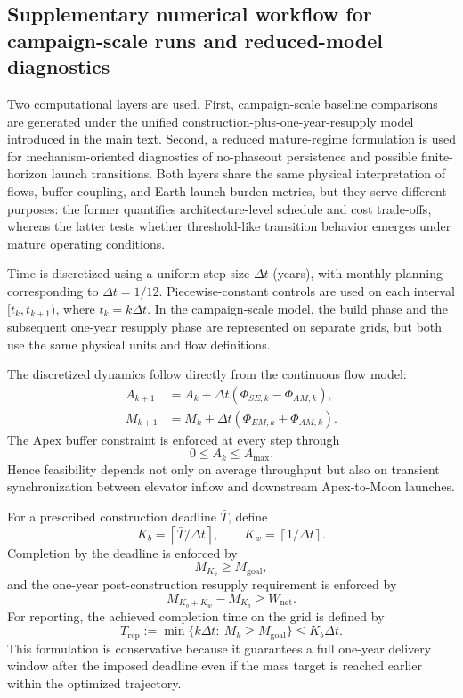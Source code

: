 \documentclass[12pt]{article}
\begin{document}
\subsection{Supplementary numerical workflow for campaign-scale runs and reduced-model diagnostics}
\label{app:numerics}

Two computational layers are used. First, campaign-scale baseline comparisons are generated under the unified construction-plus-one-year-resupply model introduced in the main text. Second, a reduced mature-regime formulation is used for mechanism-oriented diagnostics of no-phaseout persistence and possible finite-horizon launch transitions. Both layers share the same physical interpretation of flows, buffer coupling, and Earth-launch-burden metrics, but they serve different purposes: the former quantifies architecture-level schedule and cost trade-offs, whereas the latter tests whether threshold-like transition behavior emerges under mature operating conditions.

Time is discretized using a uniform step size $\Delta t$ (years), with monthly planning corresponding to $\Delta t=1/12$. Piecewise-constant controls are used on each interval $[t_k,t_{k+1})$, where $t_k=k\Delta t$. In the campaign-scale model, the build phase and the subsequent one-year resupply phase are represented on separate grids, but both use the same physical units and flow definitions.

The discretized dynamics follow directly from the continuous flow model:
\begin{align}
	A_{k+1} &= A_k + \Delta t\left(\Phi_{SE,k}-\Phi_{AM,k}\right), \label{eq:disc_A_rev_app}\\
	M_{k+1} &= M_k + \Delta t\left(\Phi_{EM,k}+\Phi_{AM,k}\right). \label{eq:disc_M_rev_app}
\end{align}
The Apex buffer constraint is enforced at every step through
\[
0\le A_k\le A_{\max}.
\]
Hence feasibility depends not only on average throughput but also on transient synchronization between elevator inflow and downstream Apex-to-Moon launches.

For a prescribed construction deadline $\bar{T}$, define
\[
K_b=\left\lceil \bar{T}/\Delta t \right\rceil,\qquad
K_w=\left\lceil 1/\Delta t \right\rceil .
\]
Completion by the deadline is enforced by
\begin{equation}
	M_{K_b}\ge M_{\mathrm{goal}},
	\label{eq:disc_completion_by_deadline_app}
\end{equation}
and the one-year post-construction resupply requirement is enforced by
\begin{equation}
	M_{K_b+K_w}-M_{K_b}\ge W_{\mathrm{net}}.
	\label{eq:disc_water_by_deadline_app}
\end{equation}
For reporting, the achieved completion time on the grid is defined by
\[
T_{\mathrm{rep}}:=\min\{k\Delta t:\ M_k\ge M_{\mathrm{goal}}\}\le K_b\Delta t.
\]
This formulation is conservative because it guarantees a full one-year delivery window after the imposed deadline even if the mass target is reached earlier within the optimized trajectory.
\end{document}
